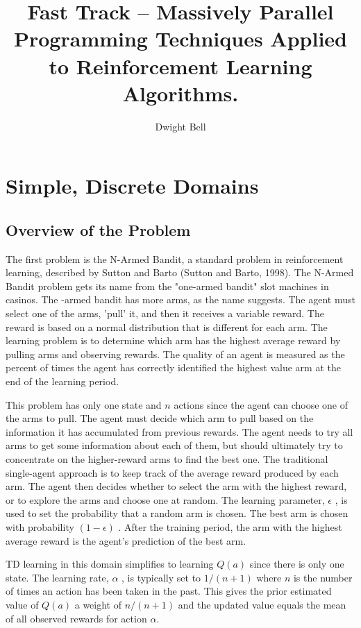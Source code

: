 \documentclass[11pt]{article} %
\title{Fast Track – Massively Parallel Programming Techniques Applied to Reinforcement Learning Algorithms. }
\author{Dwight Bell}
\begin{document}
\maketitle

\section{Simple, Discrete Domains}
\subsection{Overview of the Problem}
The first problem is the N-Armed Bandit, a standard problem in reinforcement learning, described by Sutton and Barto (Sutton and Barto, 1998). The N-Armed Bandit problem gets its name from the "one-armed bandit" slot machines in casinos.  The  -armed bandit has more arms, as the name suggests.  The agent must select one of the arms, 'pull' it, and then it receives a variable reward.  The reward is based on a normal distribution that is different for each arm.  The learning problem is to determine which arm has the highest average reward by pulling arms and observing rewards.  The quality of an agent is measured as the percent of times the agent has correctly identified the highest value arm at the end of the learning period.

This problem has only one state and $n$ actions since the agent can choose one of the   arms to pull.  The agent must decide which arm to pull based on the information it has accumulated from previous rewards.  The agent needs to try all arms to get some information about each of them, but should ultimately try to concentrate on the higher-reward arms to find the best one.  The traditional single-agent approach is to keep track of the average reward produced by each arm.  The agent then decides whether to select the arm with the highest reward, or to explore the arms and choose one at random.  The learning parameter, $\epsilon$ , is used to set the probability that a random arm is chosen.  The best arm is chosen with probability $(1-\epsilon)$ .  After the training period, the arm with the highest average reward is the agent’s prediction of the best arm.

TD learning in this domain simplifies to learning $Q(a)$  since there is only one state.  The learning rate, $\alpha$ , is typically set to $1/(n+1)$ where $n$ is the number of times an action has been taken in the past.  This gives the prior estimated value of $Q(a)$ a weight of $n/(n+1)$ and the updated value equals the mean of all observed rewards for action $\alpha$.
\end{document}
